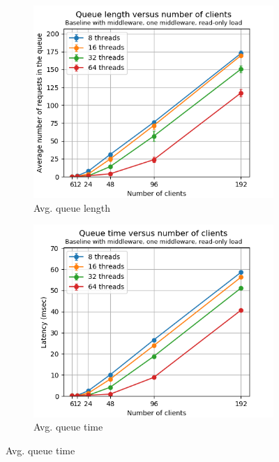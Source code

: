 \documentclass[11pt,a4paper]{article}
\begin{document}
\begin{figure}[h]
\centering
\begin{subfigure}{.33\textwidth}
  \centering
  \includegraphics[width=1.0\linewidth,trim={5px 0px 20px 0px},clip]{img/plot/mwb1-ro-qlen-mini.png}
  \caption{Avg. queue length}
  \label{fig:mwb1-ro-qlen-mini}
\end{subfigure}%
\begin{subfigure}{.33\textwidth}
  \centering
  \includegraphics[width=1.0\linewidth,trim={5px 0px 20px 0px},clip]{img/plot/mwb1-ro-qtime-mini.png}
  \caption{Avg. queue time}
  \label{fig:mwb1-ro-qtime-mini}

\end{subfigure}
\end{figure}
\end{document}
